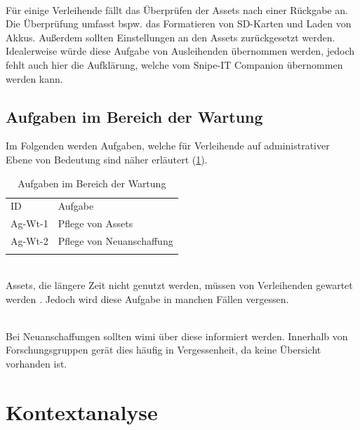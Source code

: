 {\sffamily\color{maincolor}{Ag-Rg-2 | Überprüfung der Assets}}\\
Für einige Verleihende fällt das Überprüfen der Assets nach einer Rückgabe an. Die
Überprüfung umfasst bspw. das Formatieren von SD-Karten und Laden von Akkus. Außerdem sollten
Einstellungen an den Assets zurückgesetzt werden. Idealerweise würde diese Aufgabe von Ausleihenden
übernommen werden, jedoch fehlt auch hier die Aufklärung, welche vom Snipe-IT Companion übernommen
werden kann.
\subsection{Aufgaben im Bereich der Wartung}
\label{subsec:wartung}
Im Folgenden werden Aufgaben, welche für Verleihende auf administrativer Ebene von Bedeutung sind
näher erläutert (\ref{table:Ag-Wt}).

\begin{table}[h]
        \centering
        \caption{Aufgaben im Bereich der Wartung}
        \begin{tabular}{ll}
                \arrayrulecolor{maincolor}\hline
                \sffamily\color{maincolor}ID & \sffamily\color{maincolor}Aufgabe \\
                \arrayrulecolor{maincolor}\hline
                Ag-Wt-1                      & Pflege von Assets                 \\
                Ag-Wt-2                      & Pflege von Neuanschaffung         \\
                \arrayrulecolor{maincolor}\hline
        \end{tabular}
        \label{table:Ag-Wt}
\end{table}

{\sffamily\color{maincolor}{Ag-Wt-1 | Pflege von Assets}}\\
Assets, die längere Zeit nicht genutzt werden, müssen von Verleihenden gewartet werden
\textit. Jedoch wird diese Aufgabe in manchen Fällen vergessen.

        {\sffamily\color{maincolor}{Ag-Wt-2 | Pflege von Assets}} \\
Bei Neuanschaffungen sollten \ac{wimi} über diese informiert werden. Innerhalb von
Forschungsgruppen gerät dies häufig in Vergessenheit, da keine Übersicht vorhanden ist.


\section{Kontextanalyse}
\label{section:kontext}

